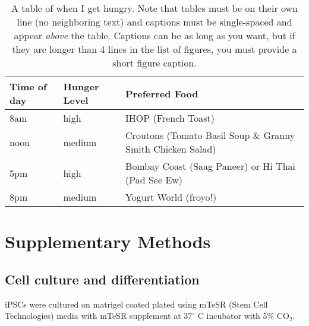 \vspace{0.25in}
\begin{table}[!ht]
\caption[Short figure caption (must be  lines in the list of tables)]{A table of when I get hungry.  Note that tables must be on their own line (no neighboring text) and captions must be single-spaced and appear \protect\textit{above} the table.  Captions can be as long as you want, but if they are longer than 4 lines in the list of figures, you must provide a short figure caption.}

\vspace{-0.25in}
\begin{center}
\begin{tabular}{|p{1in}|p{2in}|p{3in}|}

\hline
Time of day & Hunger Level & Preferred Food \\

\hline
8am & high & IHOP (French Toast) \\

\hline
noon & medium & Croutons (Tomato Basil Soup \& Granny Smith Chicken Salad) \\

\hline
5pm & high & Bombay Coast (Saag Paneer) or Hi Thai (Pad See Ew) \\

\hline
8pm & medium & Yogurt World (froyo!) \\

\hline
\end{tabular}
\end{center}
\label{tab:analysis3}
\end{table}


\section{Supplementary Methods}

\setlength\parindent{24pt}


\subsection{Cell culture and differentiation}

iPSCs were cultured on matrigel coated plated using mTeSR (Stem Cell Technologies) media with mTeSR supplement at $37^\circ$ C incubator with 5\% CO$_{2}$.\par

